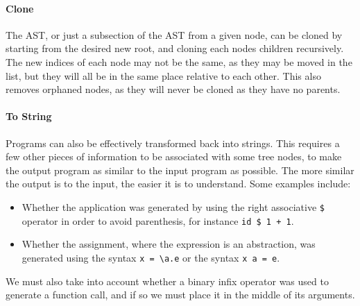 \paragraph{Clone} The AST, or just a subsection of the AST from a given node, can be cloned by starting from the desired new root, and cloning each nodes children recursively. The new indices of each node may not be the same, as they may be moved in the list, but they will all be in the same place relative to each other. This also removes orphaned nodes, as they will never be cloned as they have no parents. 

\paragraph{To String} \label{paragraph:to_string} Programs can also be effectively transformed back into strings. This requires a few other pieces of information to be associated with some tree nodes, to make the output program as similar to the input program as possible. The more similar the output is to the input, the easier it is to understand. Some examples include:
\begin{itemize}
    \item Whether the application was generated by using the right associative \verb|$| operator in order to avoid parenthesis, for instance \verb|id $ 1 + 1|. 
    \item Whether the assignment, where the expression is an abstraction, was generated using the syntax \verb|x = \a.e| or the syntax \verb|x a = e|. 
\end{itemize}
We must also take into account whether a binary infix operator was used to generate a function call, and if so we must place it in the middle of its arguments. 


